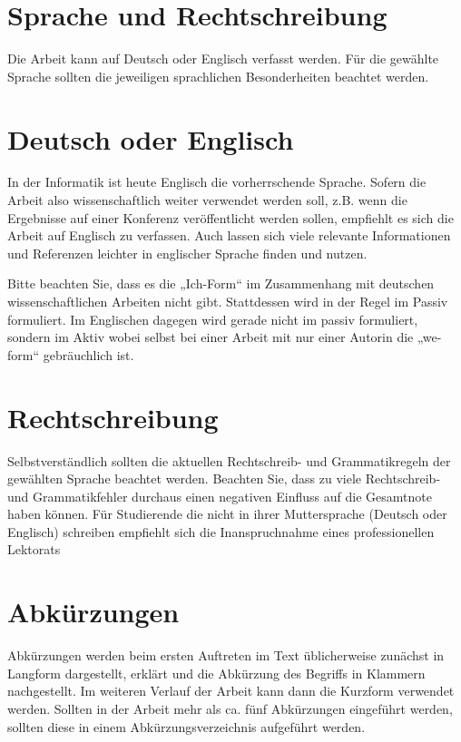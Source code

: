 \section{Sprache und Rechtschreibung}\label{sec:language}
%
Die Arbeit kann auf Deutsch oder Englisch verfasst werden. Für die gewählte Sprache sollten die jeweiligen sprachlichen Besonderheiten beachtet werden.

\section{Deutsch oder Englisch}\label{sec:language:german_and_english}
%
In der Informatik ist heute Englisch die vorherrschende Sprache. Sofern die Arbeit also wissenschaftlich weiter verwendet werden soll, z.B. wenn die Ergebnisse auf einer Konferenz veröffentlicht werden sollen, empfiehlt es sich die Arbeit auf Englisch zu verfassen. Auch lassen sich viele relevante Informationen und Referenzen leichter in englischer Sprache finden und nutzen.

Bitte beachten Sie, dass es die „Ich-Form“ im Zusammenhang mit deutschen wissenschaftlichen Arbeiten nicht gibt. Stattdessen wird in der Regel im Passiv formuliert. Im Englischen dagegen wird gerade nicht im passiv formuliert, sondern im Aktiv wobei selbst bei einer Arbeit mit nur einer Autorin die „we-form“ gebräuchlich ist.

\section{Rechtschreibung}\label{sec:language:spelling}
%
Selbstverständlich sollten die aktuellen Rechtschreib- und Grammatikregeln der gewählten Sprache beachtet werden. Beachten Sie, dass zu viele Rechtschreib- und Grammatikfehler durchaus einen negativen Einfluss auf die Gesamtnote haben können. Für Studierende die nicht in ihrer Muttersprache (Deutsch oder Englisch) schreiben empfiehlt sich die Inanspruchnahme eines professionellen Lektorats

\section{Abkürzungen}\label{sec:language:abbrevations}
%
Abkürzungen werden beim ersten Auftreten im Text üblicherweise zunächst in Langform dargestellt, erklärt und die Abkürzung des Begriffs in Klammern nachgestellt. Im weiteren Verlauf der Arbeit kann dann die Kurzform verwendet werden. Sollten in der Arbeit mehr als ca. fünf Abkürzungen eingeführt werden, sollten diese in einem Abkürzungsverzeichnis aufgeführt werden.
\medskip

